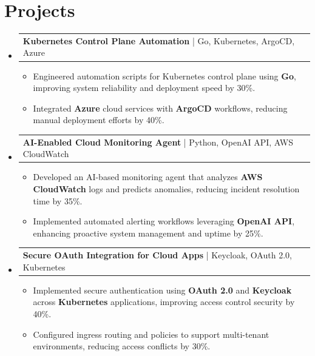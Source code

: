 \documentclass[letterpaper,11pt]{article}
\makeatletter
\newcommand{\resumeItem}[1]{
  \item\footnotesize{
    {#1 \vspace{-2pt}}
  }
}
\newcommand{\resumeProjectHeading}[2]{
    \item
    \begin{tabular*}{1.001\textwidth}{l@{\extracolsep{\fill}}r}
      \small#1 & \textbf{\small #2}\\
    \end{tabular*}\vspace{-7pt}
}
\newcommand{\resumeSubHeadingListStart}{\begin{itemize}[leftmargin=0pt, label={}]}
\newcommand{\resumeSubHeadingListEnd}{\end{itemize}}
\newcommand{\resumeItemListStart}{\begin{itemize}[leftmargin=*]}
\newcommand{\resumeItemListEnd}{\end{itemize}\vspace{-5pt}}
\makeatother
\begin{document}
\section{Projects}
    \vspace{-5pt}
    \resumeSubHeadingListStart
      \resumeProjectHeading
          {\textbf{Kubernetes Control Plane Automation} | Go, Kubernetes, ArgoCD, Azure}{}
          \resumeItemListStart
              \resumeItem{Engineered automation scripts for Kubernetes control plane using \textbf{Go}, improving system reliability and deployment speed by 30\%.}
              \resumeItem{Integrated \textbf{Azure} cloud services with \textbf{ArgoCD} workflows, reducing manual deployment efforts by 40\%.}
          \resumeItemListEnd
          \vspace{-12pt}
      \resumeProjectHeading
          {\textbf{AI-Enabled Cloud Monitoring Agent} | Python, OpenAI API, AWS CloudWatch}{}
          \resumeItemListStart
              \resumeItem{Developed an AI-based monitoring agent that analyzes \textbf{AWS CloudWatch} logs and predicts anomalies, reducing incident resolution time by 35\%.}
              \resumeItem{Implemented automated alerting workflows leveraging \textbf{OpenAI API}, enhancing proactive system management and uptime by 25\%.}
          \resumeItemListEnd
          \vspace{-12pt}
      \resumeProjectHeading
          {\textbf{Secure OAuth Integration for Cloud Apps} | Keycloak, OAuth 2.0, Kubernetes}{}
          \resumeItemListStart
              \resumeItem{Implemented secure authentication using \textbf{OAuth 2.0} and \textbf{Keycloak} across \textbf{Kubernetes} applications, improving access control security by 40\%.}
              \resumeItem{Configured ingress routing and policies to support multi-tenant environments, reducing access conflicts by 30\%.}
          \resumeItemListEnd 
    \resumeSubHeadingListEnd
\end{document}
